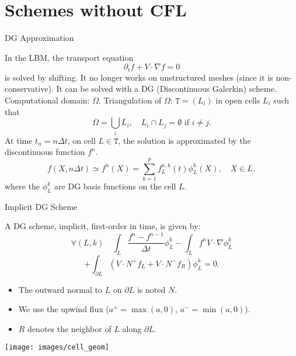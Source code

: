 \documentclass[english]{beamer}
\begin{document}
\section{Schemes without CFL}
\begin{frame}{DG Approximation}

In the LBM, the transport equation
\begin{equation}
\partial_{t}f+V\cdot\nabla f=0\label{eq:transport}
\end{equation}
is solved by shifting. It no longer works on unstructured meshes (since it is non-conservative). It can be solved with a DG (Discontinuous Galerkin) scheme. Computational domain: $\Omega$. Triangulation of $\Omega$: $\mathtt{T}=(L_{i})$ in open cells $L_{i}$
such that
\[
\overline{\Omega}=\bigcup_{i}\overline{L_{i}},\quad L_{i}\cap L_{j}=\emptyset\text{ if }i\neq j.
\]
At time $t_{n}=n\Delta t$, on cell $L\in\mathtt{T}$, the solution is approximated by the discontinuous function $f^{n}$.
\[
f(X,n\Delta t)\simeq f^{n}(X)=\sum_{k=1}^{p}f_{L}^{n,k}(t)\phi_{L}^{k}(X),\quad X\in L,
\]
where the $\phi_{L}^{k}$ are DG basis functions on the cell $L$.
\end{frame}
%
\begin{frame}{Implicit DG Scheme}

A DG scheme, implicit, first-order in time, is given by:
\[
\forall(L,k)\quad\int_{L}\frac{f^{n}-f^{n-1}}{\Delta t}\phi_{L}^{k}-\int_{L}f^{n}V\cdot\nabla\phi_{L}^{k}
\]
\[
+\int_{\partial L}\left(V\cdot N^{+}f_{L}+V\cdot N^{-}f_{R}\right)\phi_{L}^{k}=0.
\]

\begin{minipage}[c]{0.5\textwidth}%
\begin{itemize}
\item The outward normal to $L$ on $\partial L$ is noted $N$.
\item We use the upwind flux ($a^{+}=\max(a,0)$, $a^-=\min(a,0)$).
\item $R$ denotes the neighbor of $L$ along $\partial L$.
\end{itemize}
%
\end{minipage}%
\begin{minipage}[c]{0.5\textwidth}%
\begin{center}
\texttt{[image: images/cell\_geom]}
\par\end{center}%
\end{minipage}
\end{frame}
%
\end{document}
